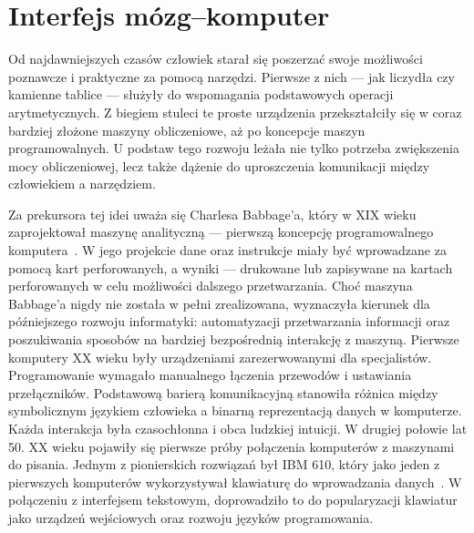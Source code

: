 \chapter{Interfejs mózg--komputer}
\label{rozdzial1}

Od najdawniejszych czasów człowiek starał się poszerzać swoje możliwości poznawcze i praktyczne za pomocą narzędzi. Pierwsze z nich --- jak liczydła czy kamienne tablice --- służyły do wspomagania podstawowych operacji arytmetycznych. Z biegiem stuleci te proste urządzenia przekształciły się w coraz bardziej złożone maszyny obliczeniowe, aż po koncepcje maszyn programowalnych. U podstaw tego rozwoju leżała nie tylko potrzeba zwiększenia mocy obliczeniowej, lecz także dążenie do uproszczenia komunikacji między człowiekiem a narzędziem.

Za prekursora tej idei uważa się Charlesa Babbage'a, który w XIX wieku zaprojektował maszynę analityczną --- pierwszą koncepcję programowalnego komputera~\cite{campbellkelly2009}. W jego projekcie dane oraz instrukcje miały być wprowadzane za pomocą kart perforowanych, a wyniki --- drukowane lub zapisywane na kartach perforowanych w celu możliwości dalszego przetwarzania. Choć maszyna Babbage'a nigdy nie została w pełni zrealizowana, wyznaczyła kierunek dla późniejszego rozwoju informatyki: automatyzacji przetwarzania informacji oraz poszukiwania sposobów na bardziej bezpośrednią interakcję z maszyną. Pierwsze komputery XX wieku były urządzeniami zarezerwowanymi dla specjalistów. Programowanie wymagało manualnego łączenia przewodów i ustawiania przełączników. Podstawową barierą komunikacyjną stanowiła różnica między symbolicznym językiem człowieka a binarną reprezentacją danych w komputerze. Każda interakcja była czasochłonna i obca ludzkiej intuicji. W drugiej połowie lat 50. XX wieku pojawiły się pierwsze próby połączenia komputerów z maszynami do pisania. Jednym z pionierskich rozwiązań był IBM 610, który jako jeden z pierwszych komputerów wykorzystywał klawiaturę do wprowadzania danych~\cite{campbellkelly2009}. W połączeniu z interfejsem tekstowym, doprowadziło to do popularyzacji klawiatur jako urządzeń wejściowych oraz rozwoju języków programowania.

